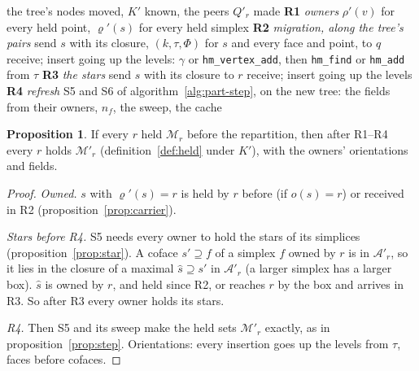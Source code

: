 \documentclass[10pt,a4paper]{article}
\theoremstyle{definition}
\newtheorem{proposition}{Proposition}
\newcommand{\fn}[1]{\texttt{#1}}
\begin{document}
\begin{algorithm}[H]
  \caption{\textsc{Repartition}: the mesh after \fn{tree\_mpi\_repartition}}
  \label{alg:part-repart}
  \begin{algorithmic}[1]
    \Require the tree's nodes moved, $K'$ known, the peers $Q'_r$ made
    \Statex \textbf{R1} \emph{owners}
    \State $\rho'(v)$ for every held point, $\varrho'(s)$ for every held
      simplex 
    \Statex \textbf{R2} \emph{migration, along the tree's pairs}
      \State send $s$ with its closure, $(k, \tau, \Phi)$ for $s$ and every
        face and point, to $q$ 
    \EndFor
    \State receive; insert going up the levels: $\gamma$ or
      \fn{hm\_vertex\_add}, then \fn{hm\_find} or \fn{hm\_add} from $\tau$
    \Statex \textbf{R3} \emph{the stars}
      \State send $s$ with its closure to $r$ 
    \EndFor
    \State receive; insert going up the levels
    \Statex \textbf{R4} \emph{refresh}
    \State S5 and S6 of algorithm~\ref{alg:part-step}, on the new tree: the
      fields from their owners, $n_f$, the sweep, the cache
  \end{algorithmic}
\end{algorithm}

\begin{proposition}
  \label{prop:repart}
  If every $r$ held $\mathcal{M}_r$ before the repartition, then after
  R1--R4 every $r$ holds $\mathcal{M}'_r$ (definition~\ref{def:held} under
  $K'$), with the owners' orientations and fields.
\end{proposition}
\begin{proof}
  \emph{Owned.} $s$ with $\varrho'(s) = r$ is held by $r$ before (if $o(s)
  = r$) or received in R2 (proposition~\ref{prop:carrier}).

  \emph{Stars before R4.} S5 needs every owner to hold the stars of its
  simplices (proposition~\ref{prop:star}). A coface $s' \supseteq f$ of a
  simplex $f$ owned by $r$ is in $\mathcal{A}'_r$, so it lies in the
  closure of a maximal $\hat s \supseteq s'$ in $\mathcal{A}'_r$ (a larger
  simplex has a larger box). $\hat s$ is owned by $r$, and held since R2,
  or reaches $r$ by the box and arrives in R3. So after R3 every owner
  holds its stars.

  \emph{R4.} Then S5 and its sweep make the held sets $\mathcal{M}'_r$
  exactly, as in proposition~\ref{prop:step}. Orientations: every
  insertion goes up the levels from $\tau$, faces before cofaces.
\end{proof}
\end{document}

